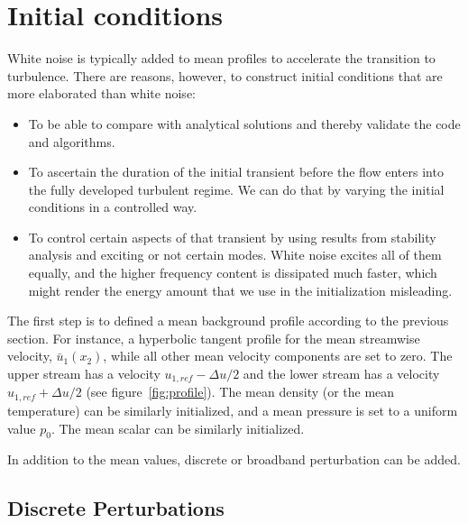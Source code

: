 \section{Initial conditions}

White noise is typically added to mean profiles to accelerate the transition to turbulence. There are reasons, however, to construct initial conditions that are more elaborated than white noise:
\begin{itemize}
  \item To be able to compare with analytical solutions and thereby validate the code and algorithms.
  \item To ascertain the duration of the initial transient before the flow enters into the fully developed turbulent regime. We can do that by varying the initial conditions in a controlled way.
  \item To control certain aspects of that transient by using results from stability analysis and exciting or not certain modes. White noise excites all of them equally, and the higher frequency content is dissipated much faster, which might render the energy amount that we use in the initialization misleading. %
\end{itemize}

The first step is to defined a mean background profile according to the previous section. For instance, a hyperbolic tangent profile for the mean streamwise velocity, $\bar{u}_1(x_2)$, while all other mean velocity components are set to zero.  The upper stream has a velocity $u_{1,ref}-\Delta u/2$ and the lower stream has a velocity $u_{1,ref}+\Delta u/2$ (see figure~\ref{fig:profile}). The mean density (or the mean temperature) can be similarly initialized, and a mean pressure is set to a uniform value $p_0$. The mean scalar can be similarly initialized.

In addition to the mean values, discrete or broadband perturbation can be added.

\subsection{Discrete Perturbations}

